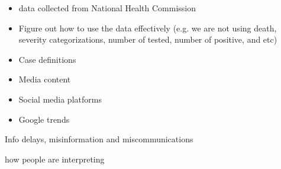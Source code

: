 \begin{itemize}
\item{data collected from National Health Commission}
\item{Figure out how to use the data effectively (e.g. we are not using death, severity categorizations, number of tested, number of positive, and etc)}
\item{Case definitions}
\item{Media content}
\item{Social media platforms}
\item{Google trends}
\end{itemize}


Info delays, misinformation and miscommunications


how people are interpreting 

